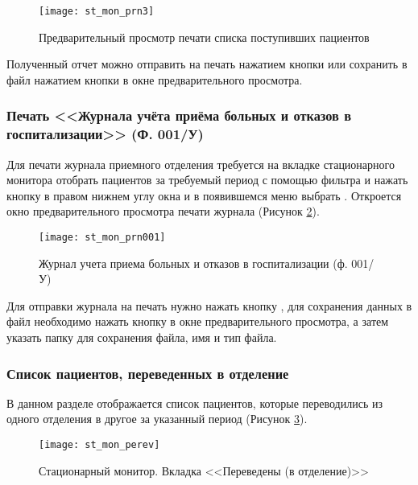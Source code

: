 \begin{figure}[ht]\centering
   \texttt{[image: st\_mon\_prn3]}
   \caption{Предварительный просмотр печати списка поступивших пациентов}
   \label{img_st_mon_prn3}
\end{figure}

Полученный отчет можно отправить на печать нажатием кнопки   или сохранить в файл нажатием кнопки   в окне предварительного просмотра.

\subsubsection{Печать <<Журнала учёта приёма больных и отказов в госпитализации>> (Ф. 001/У)}

Для печати журнала приемного отделения требуется на вкладке  стационарного монитора отобрать пациентов за требуемый период с помощью фильтра и нажать кнопку   в правом нижнем углу окна и в появившемся меню выбрать . Откроется окно предварительного просмотра печати журнала (Рисунок \ref{img_st_mon_prn001}).

\begin{figure}[ht]\centering
   \texttt{[image: st\_mon\_prn001]}
   \caption{Журнал учета приема больных и отказов в госпитализации (ф. 001/У)}
   \label{img_st_mon_prn001}
\end{figure}

Для отправки журнала на печать нужно нажать кнопку  , для сохранения данных в файл необходимо нажать кнопку   в окне предварительного просмотра, а затем указать папку для сохранения файла, имя и тип файла.

\subsubsection{Список пациентов, переведенных в отделение}

В данном разделе отображается список пациентов, которые переводились из одного отделения в другое за указанный период (Рисунок \ref{img_st_mon_perev}).

\begin{figure}[ht]\centering
   \texttt{[image: st\_mon\_perev]}
   \caption{Стационарный монитор. Вкладка <<Переведены (в отделение)>>}
   \label{img_st_mon_perev}
\end{figure}


